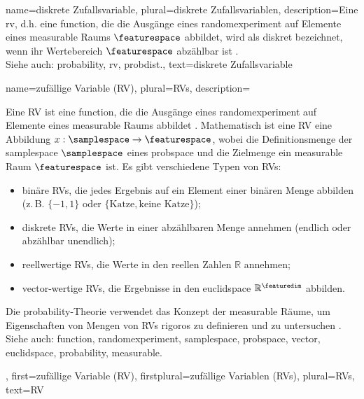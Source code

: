 {{{{
{name={diskrete Zufallsvariable}, plural={diskrete Zufallsvariablen},
description={Eine \gls{rv}, d.h. eine \gls{function}, die die 
Ausgänge eines \gls{randomexperiment} auf Elemente eines \gls{measurable} Raums 
$\featurespace$ abbildet, wird als diskret bezeichnet, wenn ihr Wertebereich $\featurespace$ 
abzählbar ist \cite{BillingsleyProbMeasure}.
\\
Siehe auch: \gls{probability}, \gls{rv}, \gls{probdist}.},
text={diskrete Zufallsvariable}
}

{name={zufällige Variable (RV)}, plural={RVs},
description={Eine RV ist eine \gls{function}, die die 
Ausgänge eines \gls{randomexperiment} auf Elemente eines \gls{measurable} Raums abbildet 
\cite{BillingsleyProbMeasure,GrayProbBook}. 
Mathematisch ist eine RV eine Abbildung $x: \samplespace \rightarrow \featurespace$, 
wobei die Definitionsmenge der \gls{samplespace} $\samplespace$ eines \gls{probspace} 
und die Zielmenge ein \gls{measurable} Raum $\featurespace$ ist. 
Es gibt verschiedene Typen von RVs:
\begin{itemize}
    \item {binäre RVs}, die jedes Ergebnis auf ein Element einer binären Menge abbilden (z.\,B. $\{-1,1\}$ oder $\{\text{Katze}, \text{keine Katze}\}$);
    \item {diskrete RVs}, die Werte in einer abzählbaren Menge annehmen (endlich oder abzählbar unendlich);
    \item {reellwertige RVs}, die Werte in den reellen Zahlen $\mathbb{R}$ annehmen;
    \item {\gls{vector}-wertige RVs}, die Ergebnisse in den \gls{euclidspace} $\mathbb{R}^{\featuredim}$ abbilden.
\end{itemize}
Die \gls{probability}-Theorie verwendet das Konzept der \gls{measurable} Räume, um Eigenschaften von Mengen von RVs rigoros zu definieren und zu untersuchen \cite{BillingsleyProbMeasure}.
\\
Siehe auch: \gls{function}, \gls{randomexperiment}, \gls{samplespace}, \gls{probspace}, \gls{vector}, \gls{euclidspace}, \gls{probability}, \gls{measurable}.},
first={zufällige Variable (RV)},
firstplural={zufällige Variablen (RVs)},
plural={RVs},
text={RV}
}

}}}}

